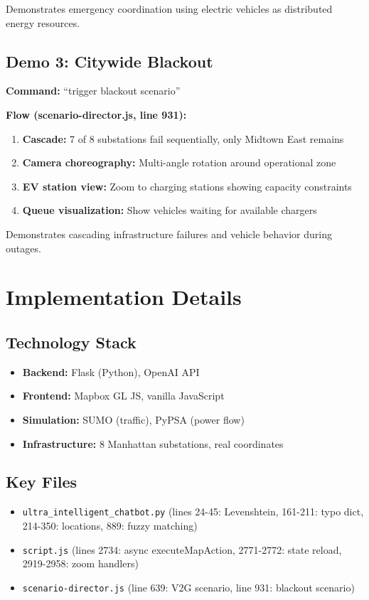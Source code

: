 \documentclass[sigconf]{acmart}
\begin{document}
Demonstrates emergency coordination using electric vehicles as distributed energy resources.

\subsection{Demo 3: Citywide Blackout}

\textbf{Command:} ``trigger blackout scenario''

\textbf{Flow (scenario-director.js, line 931):}
\begin{enumerate}
    \item \textbf{Cascade:} 7 of 8 substations fail sequentially, only Midtown East remains
    \item \textbf{Camera choreography:} Multi-angle rotation around operational zone
    \item \textbf{EV station view:} Zoom to charging stations showing capacity constraints
    \item \textbf{Queue visualization:} Show vehicles waiting for available chargers
\end{enumerate}

Demonstrates cascading infrastructure failures and vehicle behavior during outages.

\section{Implementation Details}

\subsection{Technology Stack}

\begin{itemize}
    \item \textbf{Backend:} Flask (Python), OpenAI API
    \item \textbf{Frontend:} Mapbox GL JS, vanilla JavaScript
    \item \textbf{Simulation:} SUMO (traffic), PyPSA (power flow)
    \item \textbf{Infrastructure:} 8 Manhattan substations, real coordinates
\end{itemize}

\subsection{Key Files}

\begin{itemize}
    \item \texttt{ultra\_intelligent\_chatbot.py} (lines 24-45: Levenshtein, 161-211: typo dict, 214-350: locations, 889: fuzzy matching)
    \item \texttt{script.js} (lines 2734: async executeMapAction, 2771-2772: state reload, 2919-2958: zoom handlers)
    \item \texttt{scenario-director.js} (line 639: V2G scenario, line 931: blackout scenario)
\end{itemize}
\end{document}
